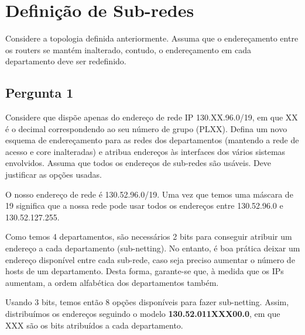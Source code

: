 \documentclass[11pt]{article}
\begin{document}


\clearpage
\section{Definição de Sub-redes}

Considere a topologia definida anteriormente. Assuma que o endereçamento entre os routers se mantém inalterado, contudo, o endereçamento em cada departamento deve ser redefinido.

\vspace{1cm}

\subsection{Pergunta 1}

Considere que dispõe apenas do endereço de rede IP 130.XX.96.0/19, em que XX é o decimal correspondendo ao seu número de grupo (PLXX). Defina um novo esquema de endereçamento para as redes dos departamentos (mantendo a rede de acesso e core inalteradas) e atribua endereços às interfaces dos vários sistemas envolvidos. Assuma que todos os endereços de sub-redes são usáveis. Deve justificar as opções usadas.

\vspace{0.5cm}

O nosso endereço de rede é 130.52.96.0/19. Uma vez que temos uma máscara de 19 significa que a nossa rede pode usar todos os endereços entre 130.52.96.0 e 130.52.127.255.

Como temos 4 departamentos, são necessários 2 bits para conseguir atribuir um endereço a cada departamento (sub-netting). No entanto, é boa prática deixar um endereço disponível entre cada sub-rede, caso seja preciso aumentar o número de hosts de um departamento. Desta forma, garante-se que, à medida que os IPs aumentam, a ordem alfabética dos departamentos também.

Usando 3 bits, temos então 8 opções disponíveis para fazer sub-netting. Assim, distribuímos os endereços seguindo o modelo \textbf{130.52.011XXX00.0}, em que XXX são os bits atribuídos a cada departamento.
\end{document}
